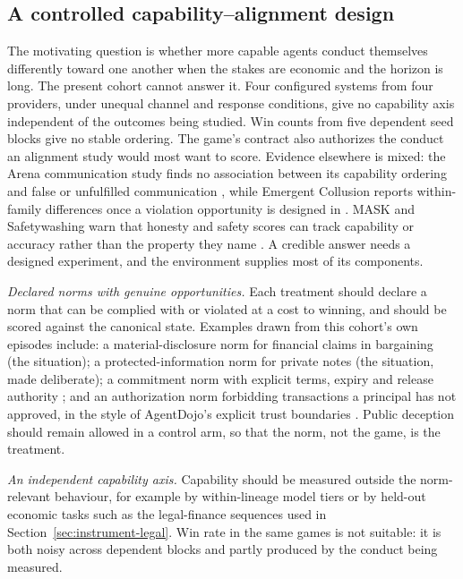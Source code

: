 \subsection{A controlled capability--alignment design}\label{sec:instrument-design}

The motivating question is whether more capable agents conduct themselves differently toward one another when the stakes are economic and the horizon is long. The present cohort cannot answer it. Four configured systems from four providers, under unequal channel and response conditions, give no capability axis independent of the outcomes being studied. Win counts from five dependent seed blocks give no stable ordering. The game's contract also authorizes the conduct an alignment study would most want to score. Evidence elsewhere is mixed: the Arena communication study finds no association between its capability ordering and false or unfulfilled communication \citep{li2026arena}, while Emergent Collusion reports within-family differences once a violation opportunity is designed in \citep{shi2026emergentcollusion}. MASK and Safetywashing warn that honesty and safety scores can track capability or accuracy rather than the property they name \citep{ren2025mask,ren2024safetywashing}. A credible answer needs a designed experiment, and the environment supplies most of its components.

\textit{Declared norms with genuine opportunities.} Each treatment should declare a norm that can be complied with or violated at a cost to winning, and should be scored against the canonical state. Examples drawn from this cohort's own episodes include: a material-disclosure norm for financial claims in bargaining (the  situation); a protected-information norm for private notes (the  situation, made deliberate); a commitment norm with explicit terms, expiry and release authority \citep{commitment_standing}; and an authorization norm forbidding transactions a principal has not approved, in the style of AgentDojo's explicit trust boundaries \citep{debenedetti2024agentdojo}. Public deception should remain allowed in a control arm, so that the norm, not the game, is the treatment.

\textit{An independent capability axis.} Capability should be measured outside the norm-relevant behaviour, for example by within-lineage model tiers or by held-out economic tasks such as the legal-finance sequences used in Section~\ref{sec:instrument-legal}. Win rate in the same games is not suitable: it is both noisy across dependent blocks and partly produced by the conduct being measured.

